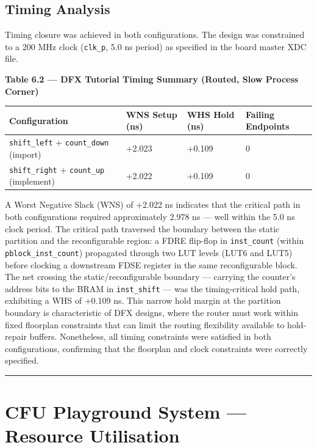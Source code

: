 \subsection{Timing Analysis}

Timing closure was achieved in both configurations. The design was constrained to a 200 MHz clock (\texttt{clk\_p}, 5.0 ns period) as specified in the board master XDC file.

\textbf{Table 6.2 — DFX Tutorial Timing Summary (Routed, Slow Process Corner)}

\begin{table}[htbp]
\centering
\begin{tabularx}{\textwidth}{X X X X}
\toprule
Configuration & WNS Setup (ns) & WHS Hold (ns) & Failing Endpoints \\
\midrule
\texttt{shift\_left} + \texttt{count\_down} (import) & +2.023 & +0.109 & 0 \\
\texttt{shift\_right} + \texttt{count\_up} (implement) & +2.022 & +0.109 & 0 \\
\bottomrule
\end{tabularx}
\end{table}

A Worst Negative Slack (WNS) of +2.022 ns indicates that the critical path in both configurations required approximately 2.978 ns — well within the 5.0 ns clock period. The critical path traversed the boundary between the static partition and the reconfigurable region: a FDRE flip-flop in \texttt{inst\_count} (within \texttt{pblock\_inst\_count}) propagated through two LUT levels (LUT6 and LUT5) before clocking a downstream FDSE register in the same reconfigurable block. The net crossing the static/reconfigurable boundary — carrying the counter's address bits to the BRAM in \texttt{inst\_shift} — was the timing-critical hold path, exhibiting a WHS of +0.109 ns. This narrow hold margin at the partition boundary is characteristic of DFX designs, where the router must work within fixed floorplan constraints that can limit the routing flexibility available to hold-repair buffers. Nonetheless, all timing constraints were satisfied in both configurations, confirming that the floorplan and clock constraints were correctly specified.

\vspace{0.4em}\hrule\vspace{0.4em}

\section{CFU Playground System — Resource Utilisation}

